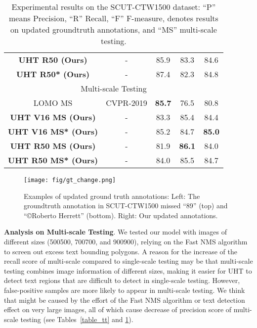 \documentclass[10pt,twocolumn,letterpaper]{article}
\begin{document}
\begin{table}[]
{\begin{tabular}{ccccc}
\multicolumn{1}{c|}{\textbf{UHT R50 (Ours)}} & \multicolumn{1}{c|}{-} & \multicolumn{1}{c|}{85.9} & \multicolumn{1}{c|}{83.3} & 84.6 \\
\multicolumn{1}{c|}{\textbf{UHT R50* (Ours)}} & \multicolumn{1}{c|}{-} & \multicolumn{1}{c|}{87.4} & \multicolumn{1}{c|}{82.3} & 84.8 \\ \hline
\multicolumn{5}{c}{Multi-scale Testing} \\ \hline
\multicolumn{1}{c|}{LOMO MS \cite{lomo-ms}} & \multicolumn{1}{c|}{CVPR-2019} & \multicolumn{1}{c|}{\textbf{85.7}} & \multicolumn{1}{c|}{76.5} & 80.8 \\ \hline
\multicolumn{1}{c|}{\textbf{UHT V16 MS (Ours)}} & \multicolumn{1}{c|}{-} & \multicolumn{1}{c|}{83.3} & \multicolumn{1}{c|}{85.4} & 84.4 \\
\multicolumn{1}{c|}{\textbf{UHT V16 MS* (Ours)}} & \multicolumn{1}{c|}{-} & \multicolumn{1}{c|}{85.2} & \multicolumn{1}{c|}{84.7} & \textbf{85.0} \\
\multicolumn{1}{c|}{\textbf{UHT R50 MS (Ours)}} & \multicolumn{1}{c|}{-} & \multicolumn{1}{c|}{81.9} & \multicolumn{1}{c|}{\textbf{86.1}} & 84.0 \\
\multicolumn{1}{c|}{\textbf{UHT R50 MS* (Ours)}} & \multicolumn{1}{c|}{-} & \multicolumn{1}{c|}{84.0} & \multicolumn{1}{c|}{85.5} & 84.7
\end{tabular}}
\vspace{0.2cm}
\caption{Experimental results on the SCUT-CTW1500 dataset: 
``P'' means Precision, ``R''  Recall, ``F'' F-measure,  denotes results on updated groundtruth annotations, and  ``MS'' multi-scale testing.} 
\label{table_ctw}
\end{table}

\begin{figure}[t]
\centering
\centering
\texttt{[image: fig/gt\_change.png]}
\caption{Examples of updated ground truth annotations: Left: The groundtruth annotation in
SCUT-CTW1500 missed ``89'' (top) and ``\copyright Roberto Herrett'' (bottom). Right:  Our updated annotations.}
\label{gt_change}
\end{figure}

\textbf{Analysis on Multi-scale Testing}. We tested our model with images of different sizes
(500500, 700700, and 900900), relying on the Fast NMS algorithm to screen out excess text bounding polygons. A reason for the increase of the recall score of multi-scale compared to single-scale testing may be that multi-scale testing combines image information of different sizes, making it easier for UHT to detect text regions that are difficult to detect in single-scale testing. However, false-positive samples are more likely to appear in multi-scale testing. We think that might be caused by the effort of the Fast NMS algorithm or text detection effect on very large images, all of which cause decrease of precision score of multi-scale testing (see Tables~\ref{table_tt} and \ref{table_ctw}).
\end{document}
